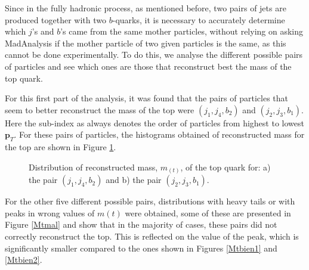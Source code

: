 Since in the fully hadronic process, as mentioned before, two pairs of jets are produced together with two  $b$-quarks, it is necessary to accurately determine which $j$'s and $b$'s came from the same mother particles, without relying on asking MadAnalysis if the mother particle of two given particles is the same, as this cannot be done experimentally. To do this, we analyse the different possible pairs of particles and see which ones are those that reconstruct best the mass of the top quark. 

For this first part of the analysis, it was found that the pairs of particles that seem to better reconstruct the mass of the top were $(j_1,j_4,b_2)$ and $(j_2,j_3,b_1)$. Here the sub-index as always denotes the order of particles from highest to lowest $\bm{p}_T$. For these pairs of particles, the histograms obtained of reconstructed mass for the top are shown in Figure \ref{Mtbien}.

\begin{figure}[ht!]
     \begin{center}
    \end{center}
    \caption{Distribution of reconstructed mass, $m_(t)$, of the top quark for: a) the pair $(j_1, j_4, b_2)$ and b) the pair $(j_2, j_3, b_1)$.} 
    \label{Mtbien}
\end{figure}

For the other five different possible pairs, distributions with heavy tails or with peaks in wrong values of $m(t)$ were obtained, some of these are presented in Figure \ref{Mtmal} and show that in the majority of cases, these pairs did not correctly reconstruct the top. This is reflected on the value of the peak, which is significantly smaller compared to the ones shown in Figures \ref{Mtbien1} and \ref{Mtbien2}.

